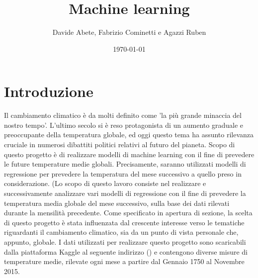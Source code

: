 \documentclass[10pt, a4paper, twocolumn]{article} %
\title{Machine learning} %
\author{
	Davide Abete, Fabrizio Cominetti e Agazzi Ruben %
}
\date{\today} %
\begin{document}
\maketitle %

\thispagestyle{firstpage} %

\tableofcontents
{}



\section{Introduzione}
Il cambiamento climatico è da molti definito come 'la più grande minaccia del nostro tempo'.
L'ultimo secolo si è reso protagonista di un aumento graduale e preoccupante della temperatura globale, ed oggi questo tema ha assunto rilevanza cruciale in numerosi dibattiti politici relativi al futuro del pianeta.%
Scopo di questo progetto è di realizzare modelli di machine learning con il fine di prevedere le future temperature medie globali. Precisamente, saranno utilizzati modelli di regressione per prevedere la temperatura del mese successivo a quello preso in considerazione.
(Lo scopo di questo lavoro consiste nel realizzare e successivamente analizzare vari modelli di regressione con il fine di prevedere la temperatura media globale del mese successivo, sulla base dei dati rilevati durante la mensilità precedente.
Come specificato in apertura di sezione, la scelta di questo progetto è stata influenzata dal crescente interesse verso le tematiche riguardanti il cambiamento climatico, sia da un punto di vista personale che, appunto, globale.
I dati utilizzati per realizzare questo progetto sono scaricabili dalla piattaforma Kaggle al seguente indirizzo () e contengono diverse misure di temperature medie, rilevate ogni mese a partire dal Gennaio 1750 al Novembre 2015.
\end{document}
